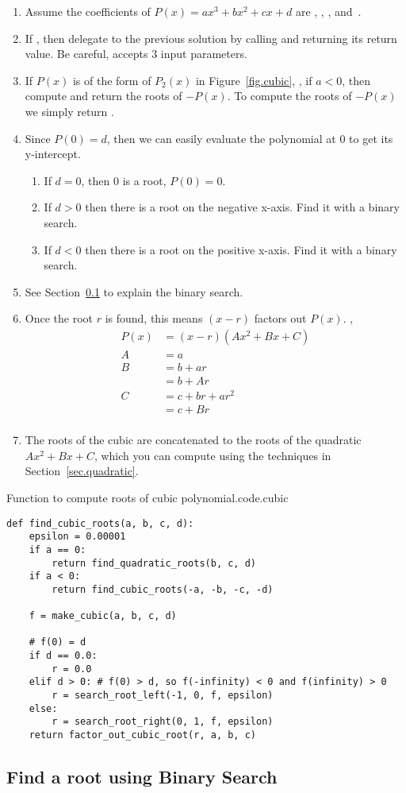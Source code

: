 \begin{enumerate}
\item Assume the coefficients of $P(x) = a x^3 + b x^2 + c x + d$ are
  ,  ,  ,  and~.
\item If , then delegate to the previous solution by
  calling  and returning its return
  value.  Be careful,  accepts 3 input
  parameters.
\item If $P(x)$ is of the form of $P_2(x)$ in Figure~\ref{fig.cubic},
  \ie, if $a<0$, then compute and return the roots of $-P(x)$.  To
  compute the roots of $-P(x)$ we simply return
  .
\item Since $P(0) = d$, then we can easily evaluate the polynomial at 0 to get its y-intercept.
  \begin{enumerate}
  \item If $d = 0$, then 0 is a root, $P(0) = 0$.
  \item If $d>0$ then there is a root on the negative x-axis.  Find it with a binary search.
  \item If $d<0$ then there is a root on the positive x-axis. Find it with a binary search.
  \end{enumerate}
\item See Section~\ref{sec.binary.search} to explain the binary search.
\item Once the root $r$ is found, this means $(x-r)$ factors out $P(x)$. \Ie,
  \begin{align*}
    P(x) &= (x-r)(A x^2 + B x + C)\\ 
    A &= a\\
    B &= b + a r \\
    &= b + A r\\
    C &= c + b r + a r^2 \\
    &=
    c + B r\\
  \end{align*}
\item The roots of the cubic are \code{[r]} concatenated to the roots of the quadratic 
  $A x^2 + B x + C$, which you can compute using the techniques in Section~\ref{sec.quadratic}.
\end{enumerate}

\begin{listing}{Function to compute roots of cubic polynomial.}{code.cubic}
\begin{minipage}[c]{0.98\textwidth}\begin{lstlisting}
def find_cubic_roots(a, b, c, d):
    epsilon = 0.00001
    if a == 0:
        return find_quadratic_roots(b, c, d)
    if a < 0:
        return find_cubic_roots(-a, -b, -c, -d)

    f = make_cubic(a, b, c, d)

    # f(0) = d
    if d == 0.0:
        r = 0.0
    elif d > 0: # f(0) > d, so f(-infinity) < 0 and f(infinity) > 0
        r = search_root_left(-1, 0, f, epsilon)
    else:
        r = search_root_right(0, 1, f, epsilon)
    return factor_out_cubic_root(r, a, b, c)
\end{lstlisting}\end{minipage}\end{listing}

\subsection{Find a root using Binary Search}
\label{sec.binary.search}

